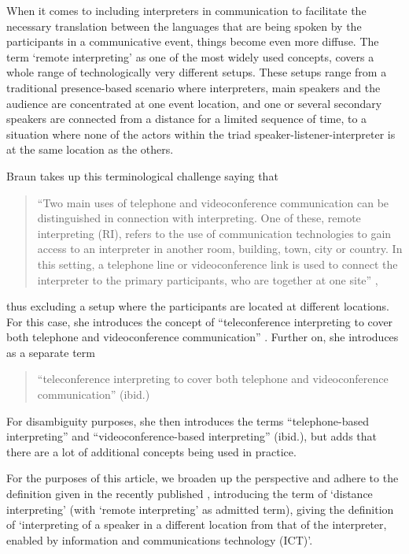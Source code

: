 \documentclass[output=paper]{langsci/langscibook}
\begin{document}
When it comes to including interpreters in communication to facilitate the necessary translation between the languages that are being spoken by the participants in a communicative event, things become even more diffuse. The term ‘remote interpreting’ as one of the most widely used concepts, covers a whole range of technologically very different setups. These setups range from a traditional presence-based scenario where interpreters, main speakers and the audience are concentrated at one event location, and one or several secondary speakers are connected from a distance for a limited sequence of time, to a situation where none of the actors within the triad speaker-listener-interpreter is at the same location as the others. 

Braun takes up this terminological challenge saying that 

\begin{quote}
	“Two main uses of telephone and videoconference communication can be distinguished in connection with interpreting. One of these, {remote interpreting (RI)}, refers to the use of communication technologies to gain access to an interpreter in another room, building, town, city or country. In this setting, a telephone line or videoconference link is used to connect the interpreter to the primary participants, who are together at one site” \citep[1]{Braun2015},
\end{quote}

thus excluding a setup where the participants are located at different locations. For this case, she introduces the concept of “{teleconference interpreting} to cover both telephone and videoconference communication” \citep[2]{Braun2015}. Further on, she introduces as a separate term

\begin{quote}
	“{teleconference interpreting} to cover both telephone and videoconference communication” (ibid.)
\end{quote}

For disambiguity purposes, she then introduces the terms “{telephone-based interpreting}” and “{videoconference-based interpreting}” (ibid.), but adds that there are a lot of additional concepts being used in practice.

For the purposes of this article, we broaden up the perspective and adhere to the definition given in the recently published \citet{ISO20108}, introducing the term of ‘distance interpreting’ (with ‘remote interpreting’ as admitted term), giving the definition of ‘interpreting of a speaker in a different location from that of the interpreter, enabled by information and communications technology (\textsc{ICT})’. 
\end{document}
